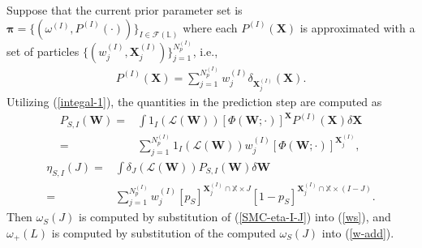 \documentclass[journal]{IEEEtran}
\newcommand{\bW}{{\mathbf W}}
\newcommand{\bX}{{\mathbf X}}
\newcommand{\bpi}{{\boldsymbol\pi}}
\begin{document}
{Suppose that the current prior parameter set is $\bpi=\{(\omega^{(I)},P^{(I)}(\cdot))\}_{I\in\mathcal{F}(\mathbb{L})}$ where each $P^{(I)}(\bX)$ is approximated with a set of particles $\{(w^{(I)}_j,\bX^{(I)}_j)\}_{j=1}^{N_p^{(I)}}$, i.e.,
\begin{align}
P^{(I)}(\bX)={\sum}_{j=1}^{N_p^{(I)}}
w^{(I)}_j \delta_{\bX_j^{(I)}}(\bX).\end{align}
Utilizing (\ref{integal-1}), the  quantities in the prediction step are computed as 
\begin{equation}
\begin{split}
\label{SMC-P-I-J} \!\!\!\!\!\!\!\!\!\!\!\!\!\!\!\!\!\!\!\!\!\!\!\!\!\!\!\!\!\!\!\!\!\!\!\!\!\!\!\!\!\!\!\!\!\!\!\!\!\!\!\!P_{S,I}(\bW)
=&\!\int \!1_{I}(\mathcal{L}(\bW))[\Phi(\bW;\cdot)]^{\bX} P^{(I)}(\bX) \delta\bX\\
=&{\sum}_{j=1}^{N_p^{(I)}} 1_{I}(\mathcal{L}(\bW))w^{(I)}_j [\Phi(\bW;\cdot)]^{\bX^{(I)}_j},
\end{split}
\end{equation}
\begin{equation}
\begin{split}
\label{SMC-eta-I-J}
\!\!\!\eta_{S,I}(J)
=&\!\!\int\! \delta_J(\mathcal{L}(\bW))P_{S,I}(\bW)\delta\bW\\
=&{\sum}_{j=1}^{N_p^{(I)}}\! w^{(I)}_{j}[p_S]^{\bX_j^{(I)}\cap\mathbb{X}\times J}[1\!-\!p_S]^{\bX_j^{(I)}\cap\mathbb{X}\times (I\!-\!J)}.
\end{split}
\end{equation}
Then  $\omega_S(J)$ is computed by substitution of (\ref{SMC-eta-I-J})  into (\ref{ws}), and  $\omega_+(L)$ is computed by substitution of the computed $\omega_S(J)$ into (\ref{w-add}).


}
\end{document}
